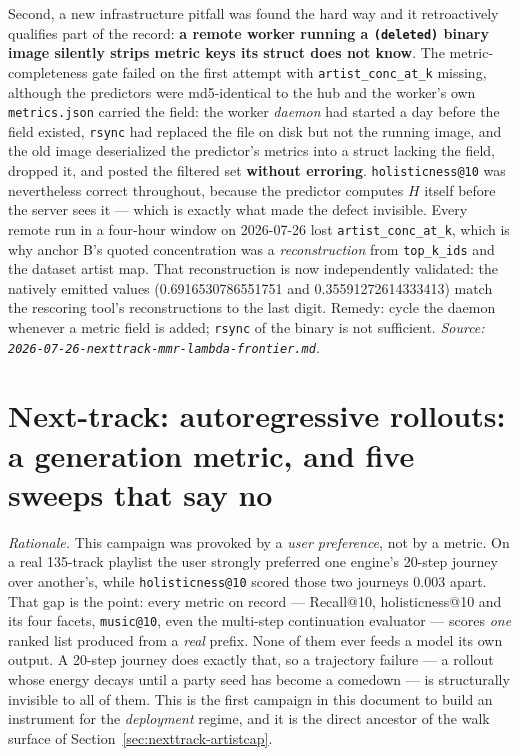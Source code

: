 \documentclass[11pt]{article}
\begin{document}
Second, a new infrastructure pitfall was found the hard way and it retroactively
qualifies part of the record: \textbf{a remote worker running a
\texttt{(deleted)} binary image silently strips metric keys its struct does not
know}. The metric-completeness gate failed on the first attempt with
\texttt{artist\_conc\_at\_k} missing, although the predictors were md5-identical
to the hub and the worker's own \texttt{metrics.json} carried the field: the
worker \emph{daemon} had started a day before the field existed, \texttt{rsync}
had replaced the file on disk but not the running image, and the old image
deserialized the predictor's metrics into a struct lacking the field, dropped it,
and posted the filtered set \textbf{without erroring}. \texttt{holisticness@10}
was nevertheless correct throughout, because the predictor computes $H$ itself
before the server sees it --- which is exactly what made the defect invisible.
Every remote run in a four-hour window on 2026-07-26 lost
\texttt{artist\_conc\_at\_k}, which is why anchor B's quoted concentration was a
\emph{reconstruction} from \texttt{top\_k\_ids} and the dataset artist map. That
reconstruction is now independently validated: the natively emitted values
(\num{0.6916530786551751} and \num{0.35591272614333413}) match the rescoring
tool's reconstructions to the last digit. Remedy: cycle the daemon whenever a
metric field is added; \texttt{rsync} of the binary is not sufficient.
\emph{Source: \texttt{2026-07-26-nexttrack-mmr-lambda-frontier.md}.}

\section{Next-track: autoregressive rollouts: a generation metric, and five sweeps that say no}
\label{sec:nexttrack-rollout}
\emph{Rationale.} This campaign was provoked by a \emph{user preference}, not by a
metric. On a real 135-track playlist the user strongly preferred one engine's
20-step journey over another's, while \texttt{holisticness@10} scored those two
journeys \num{0.003} apart. That gap is the point: every metric on record ---
Recall@10, holisticness@10 and its four facets, \texttt{music@10}, even the
multi-step continuation evaluator --- scores \emph{one} ranked list produced from a
\emph{real} prefix. None of them ever feeds a model its own output. A 20-step
journey does exactly that, so a trajectory failure --- a rollout whose energy
decays until a party seed has become a comedown --- is structurally invisible to
all of them. This is the first campaign in this document to build an instrument
for the \emph{deployment} regime, and it is the direct ancestor of the walk
surface of Section~\ref{sec:nexttrack-artistcap}.
\end{document}

